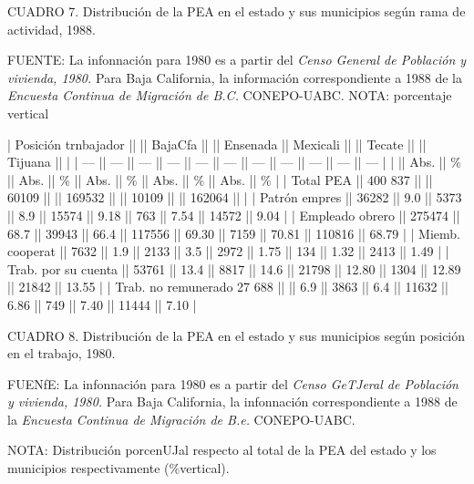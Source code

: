 \documentclass{article}
\begin{document}
CUADRO 7. Distribución de la PEA en el estado y sus municipios según rama de actividad, 1988.

FUENTE: La infonnación para 1980 es a partir del \textit{Censo General de Población y vivienda, 1980.} Para Baja California, la información correspondiente a 1988 de la \textit{Encuesta Continua de Migración de B.C.} CONEPO-UABC. NOTA: porcentaje vertical

| Posición trnbajador        ||         || BajaCfa ||       || Ensenada || Mexicali ||       || Tecate ||       || Tijuana ||       |
| ---                        || ---     || ---     || ---   || ---      || ---      || ---   || ---    || ---   || ---     || ---   |
|                            || Abs.    || \%       || Abs.  || \%        || Abs.     || \%     || Abs.   || \%     || Abs.    || \%     |
| Total PEA                  || 400 837 ||         || 60109 ||          || 169532   ||       || 10109  ||       || 162064  ||       |
| Patrón empres              || 36282   || 9.0     || 5373  || 8.9      || 15574    || 9.18  || 763    || 7.54  || 14572   || 9.04  |
| Empleado obrero            || 275474  || 68.7    || 39943 || 66.4     || 117556   || 69.30 || 7159   || 70.81 || 110816  || 68.79 |
| Miemb. cooperat            || 7632    || 1.9     || 2133  || 3.5      || 2972     || 1.75  || 134    || 1.32  || 2413    || 1.49  |
| Trab. por su cuenta        || 53761   || 13.4    || 8817  || 14.6     || 21798    || 12.80 || 1304   || 12.89 || 21842   || 13.55 |
| Trab. no remunerado 27 688 ||         || 6.9     || 3863  || 6.4      || 11632    || 6.86  || 749    || 7.40  || 11444   || 7.10  |

CUADRO 8. Distribución de la PEA en el estado y sus municipios según posición en el trabajo, 1980.

FUENfE: La infonnación para 1980 es a partir del \textit{Censo GeTJeral de Población y vivienda, 1980.} Para Baja California, la infonnación correspondiente a 1988 de la \textit{Encuesta Continua de Migración de B.e.} CONEPO-UABC.

NOTA: Distribución porcenUJal respecto al total de la PEA del estado y los municipios respectivamente (\%vertical).
\end{document}
